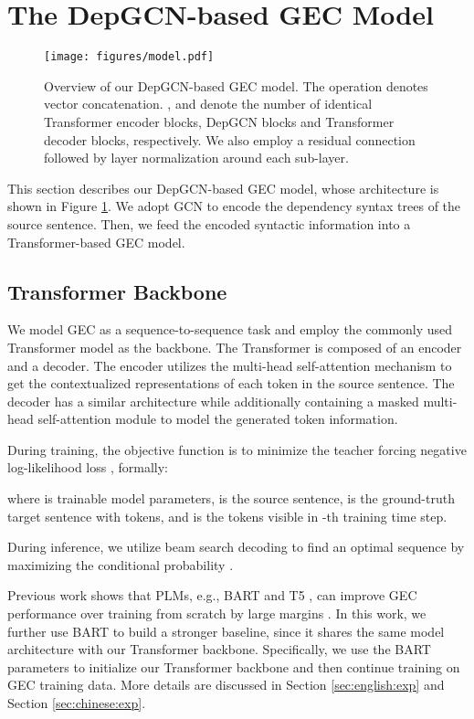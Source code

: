 \documentclass[11pt]{article}
\begin{document}
 
\section{The DepGCN-based GEC Model}
\begin{figure}[t!]
\centering
\texttt{[image: figures/model.pdf]}
\caption{Overview of our DepGCN-based GEC model. The operation  denotes vector concatenation. ,  and  denote the number of identical Transformer encoder blocks, DepGCN blocks and Transformer decoder blocks, respectively. We also employ a residual connection \citep{he2016deep} followed by layer normalization \citep{DBLP:journals/corr/BaKH16} around each sub-layer.}
\label{fig:model}
\end{figure} This section describes our DepGCN-based GEC model, whose architecture is shown in Figure \ref{fig:model}.
We adopt GCN \citep{DBLP:conf/iclr/KipfW17} to encode the dependency syntax trees of the source sentence. Then, we feed the encoded syntactic information into a Transformer-based GEC model.






\subsection{Transformer Backbone}
We model GEC as a sequence-to-sequence task and employ the commonly used Transformer model \citep{vaswani2017attention} as the backbone. The Transformer is composed of an encoder and a decoder. The encoder utilizes the multi-head self-attention mechanism to get the contextualized representations of each token in the source sentence. The decoder has a similar architecture while additionally containing a masked multi-head self-attention module to model the generated token information.

During training, the objective function is to minimize the teacher forcing negative log-likelihood loss \citep{williams1989learning}, formally:

where  is trainable model parameters,  is the source sentence,   is the ground-truth target sentence with  tokens, and   is the tokens visible in -th training time step.

During inference,  we utilize beam search decoding \citep{DBLP:conf/emnlp/WisemanR16} to find an optimal sequence  by maximizing the conditional probability .  

Previous work shows that PLMs, e.g., BART \citep{lewis2020bart} and T5 \citep{raffel2020exploring}, can improve GEC performance over training from scratch by large margins \citep{rothe2021recipe,sun2022unified}. 
In this work, we further use BART to build a stronger baseline, since it shares the same model architecture with our Transformer backbone. 
Specifically, we use the BART parameters to initialize our Transformer backbone and then continue training on GEC training data. More details are discussed in Section \ref{sec:english:exp} and Section \ref{sec:chinese:exp}. 
\end{document}
